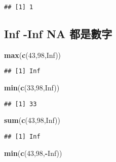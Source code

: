\documentclass[]{article}
\newenvironment{Shaded}{\begin{snugshade}}{\end{snugshade}}
\newcommand{\DecValTok}[1]{\textcolor[rgb]{0.00,0.00,0.81}{#1}}
\newcommand{\KeywordTok}[1]{\textcolor[rgb]{0.13,0.29,0.53}{\textbf{#1}}}
\newcommand{\NormalTok}[1]{#1}
\newcommand{\OperatorTok}[1]{\textcolor[rgb]{0.81,0.36,0.00}{\textbf{#1}}}
\newcommand{\OtherTok}[1]{\textcolor[rgb]{0.56,0.35,0.01}{#1}}
\begin{document}
\begin{verbatim}
## [1] 1
\end{verbatim}

\hypertarget{inf--inf-na-ux90fdux662fux6578ux5b57}{%
\subsection{Inf -Inf NA
都是數字}\label{inf--inf-na-ux90fdux662fux6578ux5b57}}

\begin{Shaded}
\begin{Highlighting}[]
\KeywordTok{max}\NormalTok{(}\KeywordTok{c}\NormalTok{(}\DecValTok{43}\NormalTok{,}\DecValTok{98}\NormalTok{,}\OtherTok{Inf}\NormalTok{))}
\end{Highlighting}
\end{Shaded}

\begin{verbatim}
## [1] Inf
\end{verbatim}

\begin{Shaded}
\begin{Highlighting}[]
\KeywordTok{min}\NormalTok{(}\KeywordTok{c}\NormalTok{(}\DecValTok{33}\NormalTok{,}\DecValTok{98}\NormalTok{,}\OtherTok{Inf}\NormalTok{))}
\end{Highlighting}
\end{Shaded}

\begin{verbatim}
## [1] 33
\end{verbatim}

\begin{Shaded}
\begin{Highlighting}[]
\KeywordTok{sum}\NormalTok{(}\KeywordTok{c}\NormalTok{(}\DecValTok{43}\NormalTok{,}\DecValTok{98}\NormalTok{,}\OtherTok{Inf}\NormalTok{))}
\end{Highlighting}
\end{Shaded}

\begin{verbatim}
## [1] Inf
\end{verbatim}

\begin{Shaded}
\begin{Highlighting}[]
\KeywordTok{min}\NormalTok{(}\KeywordTok{c}\NormalTok{(}\DecValTok{43}\NormalTok{,}\DecValTok{98}\NormalTok{,}\OperatorTok{-}\OtherTok{Inf}\NormalTok{))}
\end{Highlighting}
\end{Shaded}
\end{document}
